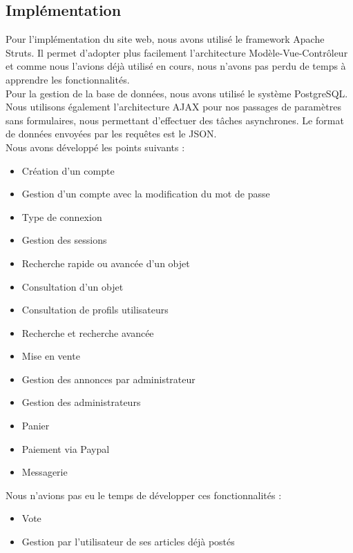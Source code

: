 \subsection{Implémentation}

Pour l'implémentation du site web, nous avons utilisé le framework Apache Struts. Il permet d'adopter plus facilement l'architecture Modèle-Vue-Contrôleur et comme nous l'avions déjà utilisé en cours, nous n'avons pas perdu de temps à apprendre les fonctionnalités.\\

Pour la gestion de la base de données, nous avons utilisé le système PostgreSQL. \\

Nous utilisons également l'architecture AJAX pour nos passages de paramètres sans formulaires, nous permettant d'effectuer des tâches asynchrones. Le format de données envoyées par les requêtes est le JSON. \\

Nous avons développé les points suivants :\\
\begin{itemize}
	\item Création d'un compte 
	\item Gestion d'un compte avec la modification du mot de passe
	\item Type de connexion 
	\item Gestion des sessions
	\item Recherche rapide ou avancée d'un objet
	\item Consultation d'un objet
	\item Consultation de profils utilisateurs
	\item Recherche et recherche avancée
	\item Mise en vente
	\item Gestion des annonces par administrateur
	\item Gestion des administrateurs
	\item Panier 
	\item Paiement via Paypal 
	\item Messagerie
\end{itemize}

Nous n'avions pas eu le temps de développer ces fonctionnalités : \\

\begin{itemize}
	\item Vote
	\item Gestion par l'utilisateur de ses articles déjà postés
\end{itemize}

